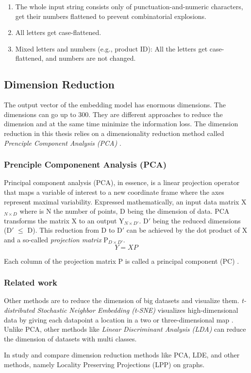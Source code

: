 \begin{enumerate}
    \item The whole input string consists only of punctuation-and-numeric characters, get their numbers flattened to prevent combinatorial explosions.
    \item All letters get case-flattened.
    \item Mixed letters and numbers (e.g., product ID): All the letters get case-flattened, and numbers are not changed.
\end{enumerate}

\subsection{Dimension Reduction}
\label{subsec:dimension-reduction}
The output vector of the embedding model has enormous dimensions. The dimensions can go up to 300. They are different approaches to reduce the dimension and at the same time minimize the information loss. The dimension reduction in this thesis relies on a dimensionality reduction method called \emph{Prenciple Component Analysis (PCA)} \cite{woldPrincipalComponentAnalysis}.

\subsubsection{Prenciple Componenent Analysis (PCA)}
\label{subsubsec:pca}
Principal component analysis (PCA), in essence, is a linear projection operator that maps a variable of interest to a new coordinate frame where the axes represent maximal variability. Expressed mathematically, an input data matrix X$_{N \times D}$ where is N the number of points, D being the dimension of data. PCA transforms the matrix X to an output Y$_{N \times D\prime}$. D$\prime$ being the reduced dimensions (D$\prime$ $\leq$ D). This reduction from D to D$\prime$ can be achieved by the dot product of X and a so-called \emph{projection matrix} P$_{D \times D\prime}$.
    \begin{equation}
        \label{PCA}
        Y = XP
    \end{equation}

Each column of the projection matrix P is called a principal component (PC) \cite{xu10701MachineLearning}. 


\subsubsection{Related work}
\label{subsubsec:dimension-reduction-related-work}
Other methods are to reduce the dimension of big datasets and visualize them. \emph{t-distributed Stochastic Neighbor Embedding (t-SNE)} visualizes high-dimensional data by giving each datapoint a location in a two or three-dimensional map \cite{vandermaaten08a}. Unlike PCA, other methods like \emph{Linear Discriminant Analysis (LDA)} \cite{balakrishnamaLINEARDISCRIMINANTANALYSIS} can reduce the dimension of datasets with multi classes.


In \cite{yanGraphEmbeddingExtensions2007} study and compare dimension reduction methods like PCA, LDE, and other methods, namely Locality Preserving Projections (LPP) on graphs.


